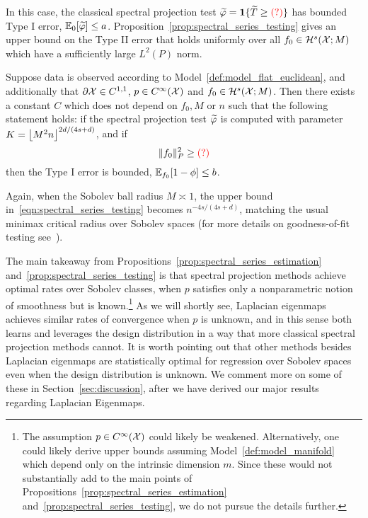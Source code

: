 In this case, the classical spectral projection test $\widetilde{\varphi} = \mathbf{1}\{\widetilde{T} \geq \textcolor{red}{(?)}\}$ has bounded Type I error, $\mathbb{E}_{0}[\widetilde{\varphi}] \leq a$. Proposition~\ref{prop:spectral_series_testing} gives an upper bound on the Type II error that holds uniformly over all $f_0 \in \mathcal{H}^s(\mathcal{X};M)$ which have a sufficiently large $L^2(P)$ norm.
\begin{proposition}
	\label{prop:spectral_series_testing}
	Suppose data is observed according to Model~\ref{def:model_flat_euclidean}, and additionally that $\partial \mathcal{X} \in C^{1,1}$, $p \in C^{\infty}(\mathcal{X})$ and $f_0 \in \mathcal{H}^{s}(\mathcal{X};M)$. Then there exists a constant $C$ which does not depend on $f_0,M$ or $n$ such that the following statement holds: if the spectral projection test $\widetilde{\varphi}$ is computed with parameter $K = \left\lfloor M^2n \right\rfloor^{2d/(4s + d)}$, and if
	\begin{equation}
	\label{eqn:spectral_series_testing}
	\|f_0\|_P^2 \geq \textcolor{red}{(?)}
	\end{equation}
	then the Type I error is bounded, $\mathbb{E}_{f_0}[1 - \phi] \leq b$.
\end{proposition}
Again, when the Sobolev ball radius $M \asymp 1$, the upper bound in~\eqref{eqn:spectral_series_testing} becomes $n^{-4s/(4s + d)}$, matching the usual minimax critical radius over Sobolev spaces (for more details on goodness-of-fit testing see~\citep{ingster2009,ingster2012}).

The main takeaway from Propositions~\ref{prop:spectral_series_estimation} and~\ref{prop:spectral_series_testing} is that spectral projection methods achieve optimal rates over Sobolev classes, when $p$ satisfies only a nonparametric notion of smoothness but is known.\footnote{The assumption $p \in C^{\infty}(\mathcal{X})$ could likely be weakened. Alternatively, one could likely derive upper bounds assuming Model~\ref{def:model_manifold} which depend only on the intrinsic dimension $m$. Since these would not substantially add to the main points of Propositions~\ref{prop:spectral_series_estimation} and~\ref{prop:spectral_series_testing}, we do not pursue the details further.} As we will shortly see, Laplacian eigenmaps achieves similar rates of convergence when $p$ is unknown, and in this sense both learns and leverages the design distribution in a way that more classical spectral projection methods cannot. It is worth pointing out that other methods besides Laplacian eigenmaps are statistically optimal for regression over Sobolev spaces even when the design distribution is unknown. We comment more on some of these in Section~\ref{sec:discussion}, after we have derived our major results regarding Laplacian Eigenmaps.

